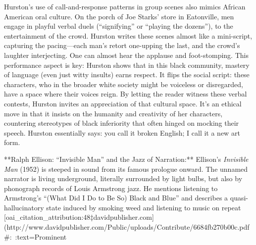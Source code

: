 \documentclass[12pt]{report}
\begin{document}
Hurston’s use of call-and-response patterns in group scenes also mimics African American oral culture. On the porch of Joe Starks’ store in Eatonville, men engage in playful verbal duels (“signifying” or “playing the dozens”), to the entertainment of the crowd. Hurston writes these scenes almost like a mini-script, capturing the pacing—each man’s retort one-upping the last, and the crowd’s laughter interjecting. One can almost hear the applause and foot-stomping. This performance aspect is key: Hurston shows that in this black community, mastery of language (even just witty insults) earns respect. It flips the social script: these characters, who in the broader white society might be voiceless or disregarded, have a space where their voices reign. By letting the reader witness these verbal contests, Hurston invites an appreciation of that cultural space. It’s an ethical move in that it insists on the humanity and creativity of her characters, countering stereotypes of black inferiority that often hinged on mocking their speech. Hurston essentially says: you call it broken English; I call it a new art form.

**Ralph Ellison: “Invisible Man” and the Jazz of Narration:** Ellison’s \textit{Invisible Man} (1952) is steeped in sound from its famous prologue onward. The unnamed narrator is living underground, literally surrounded by light bulbs, but also by phonograph records of Louis Armstrong jazz. He mentions listening to Armstrong’s “(What Did I Do to Be So) Black and Blue” and describes a quasi-hallucinatory state induced by smoking weed and listening to music on repeat [oai_citation_attribution:48‡davidpublisher.com](http://www.davidpublisher.com/Public/uploads/Contribute/6684fb270b00c.pdf#:~:text=Prominent%
\end{document}
